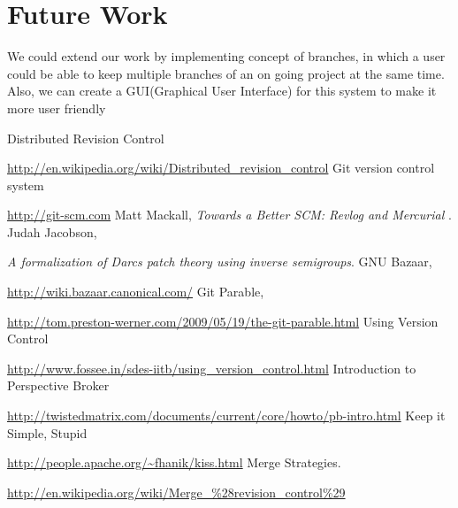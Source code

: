 \documentclass[12pt]{article}
\begin{document}
\section{Future Work}
We could extend our work by implementing concept of branches, in which a user could be able to keep multiple branches of an on going project at the same time. Also, we can create a GUI(Graphical User Interface) for this system to make it more user friendly
\begin{thebibliography}{99}
Distributed Revision Control

\url{http://en.wikipedia.org/wiki/Distributed_revision_control}
Git version control system

\url{http://git-scm.com}
Matt Mackall, \emph{Towards a Better SCM: Revlog and Mercurial} .
Judah Jacobson,

\emph{A formalization of Darcs patch theory using inverse
  semigroups}.
GNU Bazaar,

\url{http://wiki.bazaar.canonical.com/}
Git Parable,

\url{http://tom.preston-werner.com/2009/05/19/the-git-parable.html}
Using Version Control

\url{http://www.fossee.in/sdes-iitb/using_version_control.html}
Introduction to Perspective Broker

\url{http://twistedmatrix.com/documents/current/core/howto/pb-intro.html}
Keep it Simple, Stupid

\url{http://people.apache.org/~fhanik/kiss.html}
Merge Strategies.

\url{http://en.wikipedia.org/wiki/Merge_%28revision_control%29}
\end{thebibliography}
\end{document}
